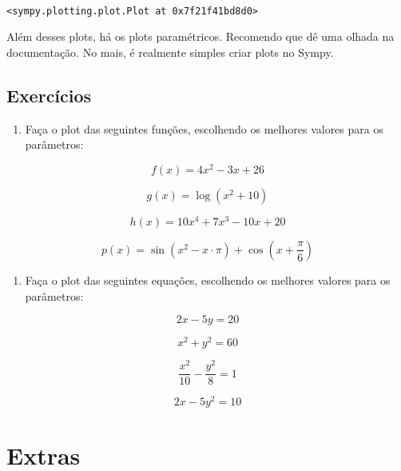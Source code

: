 \documentclass[11pt, brazilian]{article}
\makeatletter
\providecommand{\tightlist}{%
      \setlength{\itemsep}{0pt}\setlength{\parskip}{0pt}}
\newcommand{\boxspacing}{\kern\kvtcb@left@rule\kern\kvtcb@boxsep}
\newcommand{\prompt}[4]{
        \ttfamily\llap{{\color{#2}[#3]:\hspace{3pt}#4}}\vspace{-\baselineskip}
    }
\makeatother
\begin{document}
    \begin{center}
    \end{center}
    { \hspace*{\fill} \\}
    
            \begin{tcolorbox}[breakable, size=fbox, boxrule=.5pt, pad at break*=1mm, opacityfill=0]
\prompt{Out}{outcolor}{11}{\boxspacing}
\begin{Verbatim}[commandchars=\\\{\}]
<sympy.plotting.plot.Plot at 0x7f21f41bd8d0>
\end{Verbatim}
\end{tcolorbox}
        
    Além desses plots, há os plots paramétricos. Recomendo que dê uma olhada
na documentação. No mais, é realmente simples criar plots no Sympy.

\hypertarget{exercuxedcios}{%
\subsection{Exercícios}\label{exercuxedcios}}

\begin{enumerate}
\def\labelenumi{\arabic{enumi}.}
\tightlist
\item
  Faça o plot das seguintes funções, escolhendo os melhores valores para
  os parâmetros:
\end{enumerate}

\[f(x) = 4x^2 - 3x + 26\]

\[g(x) = \log(x^2 + 10)\]

\[h(x) = 10x^4 + 7x^3 - 10x + 20\]

\[p(x) = \sin(x^2 - x\cdot \pi) + \cos\left(x + \dfrac{\pi}{6}\right)\]

\begin{enumerate}
\def\labelenumi{\arabic{enumi}.}
\setcounter{enumi}{1}
\tightlist
\item
  Faça o plot das seguintes equações, escolhendo os melhores valores
  para os parâmetros:
\end{enumerate}

\[ 2x - 5y = 20\]

\[x^2 + y^2 = 60\]

\[\dfrac{x^2}{10} - \dfrac{y^2}{8} = 1\]

\[2x - 5y^2 = 10\]

    \hypertarget{extras}{%
\section{Extras}\label{extras}}
\end{document}
